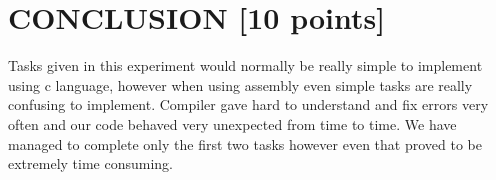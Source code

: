 \documentclass[pdftex,12pt,a4paper]{article}
\begin{document}
\section{CONCLUSION [10 points]}
Tasks given in this experiment would normally be really simple to implement using c language, however when using assembly even simple tasks are really confusing to implement. Compiler gave hard to understand and fix errors very often and our code behaved very unexpected from time to time. We have managed to complete only the first two tasks however even that proved to be extremely time consuming.

\newpage
{}



\end{document}
